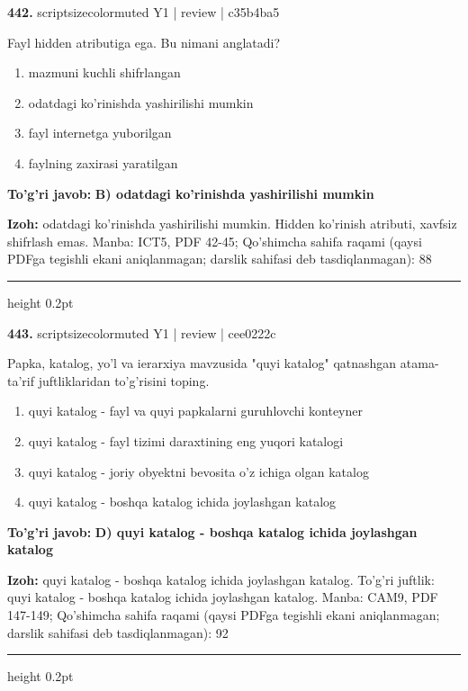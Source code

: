 \documentclass[10pt,a4paper]{article}
\begin{document}
{\bfseries\sffamily\color{ink} 442.} {scriptsizecolor{muted} Y1 | review | c35b4ba5}
\par
Fayl hidden atributiga ega. Bu nimani anglatadi?
\begin{enumerate}[label=\Alph*),leftmargin=9mm]
\item mazmuni kuchli shifrlangan
\item odatdagi ko'rinishda yashirilishi mumkin
\item fayl internetga yuborilgan
\item faylning zaxirasi yaratilgan
\end{enumerate}
\begin{tcolorbox}[enhanced,breakable,colback=teal!4,colframe=teal!60!black,boxrule=0.45pt,arc=1.2mm,left=2.7mm,right=2.7mm,top=1.8mm,bottom=1.8mm,before skip=2mm,after skip=2mm]
{\bfseries\sffamily\color{teal}To'g'ri javob:} \textbf{B) odatdagi ko'rinishda yashirilishi mumkin}
\par\smallskip
{\bfseries Izoh:} odatdagi ko'rinishda yashirilishi mumkin. Hidden ko'rinish atributi, xavfsiz shifrlash emas. Manba: ICT5, PDF 42-45; Qo'shimcha sahifa raqami (qaysi PDFga tegishli ekani aniqlanmagan; darslik sahifasi deb tasdiqlanmagan): 88
\end{tcolorbox}
\vspace{2mm}\hrule height 0.2pt\vspace{3mm}

{\bfseries\sffamily\color{ink} 443.} {scriptsizecolor{muted} Y1 | review | cee0222c}
\par
Papka, katalog, yo'l va ierarxiya mavzusida "quyi katalog" qatnashgan atama-ta'rif juftliklaridan to'g'risini toping.
\begin{enumerate}[label=\Alph*),leftmargin=9mm]
\item quyi katalog - fayl va quyi papkalarni guruhlovchi konteyner
\item quyi katalog - fayl tizimi daraxtining eng yuqori katalogi
\item quyi katalog - joriy obyektni bevosita o'z ichiga olgan katalog
\item quyi katalog - boshqa katalog ichida joylashgan katalog
\end{enumerate}
\begin{tcolorbox}[enhanced,breakable,colback=teal!4,colframe=teal!60!black,boxrule=0.45pt,arc=1.2mm,left=2.7mm,right=2.7mm,top=1.8mm,bottom=1.8mm,before skip=2mm,after skip=2mm]
{\bfseries\sffamily\color{teal}To'g'ri javob:} \textbf{D) quyi katalog - boshqa katalog ichida joylashgan katalog}
\par\smallskip
{\bfseries Izoh:} quyi katalog - boshqa katalog ichida joylashgan katalog. To'g'ri juftlik: quyi katalog - boshqa katalog ichida joylashgan katalog. Manba: CAM9, PDF 147-149; Qo'shimcha sahifa raqami (qaysi PDFga tegishli ekani aniqlanmagan; darslik sahifasi deb tasdiqlanmagan): 92
\end{tcolorbox}
\vspace{2mm}\hrule height 0.2pt\vspace{3mm}
\end{document}

